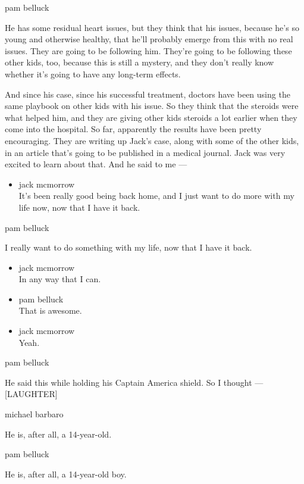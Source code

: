 pam belluck

He has some residual heart issues, but they think that his issues,
because he's so young and otherwise healthy, that he'll probably emerge
from this with no real issues. They are going to be following him.
They're going to be following these other kids, too, because this is
still a mystery, and they don't really know whether it's going to have
any long-term effects.

And since his case, since his successful treatment, doctors have been
using the same playbook on other kids with his issue. So they think that
the steroids were what helped him, and they are giving other kids
steroids a lot earlier when they come into the hospital. So far,
apparently the results have been pretty encouraging. They are writing up
Jack's case, along with some of the other kids, in an article that's
going to be published in a medical journal. Jack was very excited to
learn about that. And he said to me ---

\begin{itemize}
\tightlist
\item
  jack mcmorrow\\
  It's been really good being back home, and I just want to do more with
  my life now, now that I have it back.
\end{itemize}

pam belluck

I really want to do something with my life, now that I have it back.

\begin{itemize}
\item
  jack mcmorrow\\
  In any way that I can.
\item
  pam belluck\\
  That is awesome.
\item
  jack mcmorrow\\
  Yeah.
\end{itemize}

pam belluck

He said this while holding his Captain America shield. So I thought ---
{[}LAUGHTER{]}

michael barbaro

He is, after all, a 14-year-old.

pam belluck

He is, after all, a 14-year-old boy.

